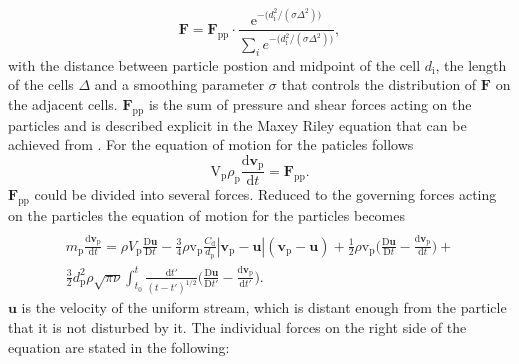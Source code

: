 \documentclass[11pt,a4paper,openany,oneside,parskip=half*]{article}
\renewcommand*\vec[1]{\boldsymbol{#1}}
\begin{document}
\begin{equation}
\vec{F} = \vec{F}_\mathrm{pp} \cdot \frac{\mathrm{e}^{- \big(d_\mathrm{i}^\mathrm{2}/(\sigma \Delta^\mathrm{2})\big)}}{\sum \limits_{i} e^{- \big(d_\mathrm{i}^\mathrm{2}/(\sigma \Delta^\mathrm{2}) \big)}},
\end{equation}
with the distance between particle postion and midpoint of the cell $d_\mathrm{i}$, the length of the cells $\Delta$ and a smoothing parameter $\sigma$ that controls the distribution of $\vec{F}$ on the adjacent cells.
$\vec{F}_\mathrm{pp}$ is the sum of pressure and shear forces acting on the particles and is described explicit in the Maxey Riley equation that can be achieved from \cite{EquationOfMotionForASmallRigidSphereInANonuniformFlow}.
For the equation of motion for the paticles follows
\begin{equation}
\mathrm{V}_\mathrm{p} \rho_\mathrm{p} \frac{\mathrm{d}\vec{v}_\mathrm{p}}{\mathrm{d}t} = \vec{F}_\mathrm{pp}.
\end{equation}
$\vec{F}_\mathrm{pp}$ could be divided into several forces. 
Reduced to the governing forces acting on the particles the equation of motion for the particles becomes
\begin{multline} \label{navier_stokes_particle}
\\ m_\mathrm{p} \frac{\mathrm{d}\vec{v}_\mathrm{p}}{\mathrm{d}t} =\rho V_\mathrm{p}\frac{\mathrm{D}\vec{u}}{\mathrm{D}t} -\frac{3}{4}\rho \mathrm{v}_\mathrm{p} \frac{C_\mathrm{d}}{d_\mathrm{p}}|\vec{v}_\mathrm{p}-\vec{u}|(\vec{v}_\mathrm{p}-\vec{u})+ \frac{1}{2}\rho \mathrm{v}_\mathrm{p} \biggl(\frac{\mathrm{D}\vec{u}}{\mathrm{D}t}-\frac{\mathrm{d}\vec{v}_\mathrm{p}}{\mathrm{d}t}\biggl) + 
\\ \frac{3}{2}d_\mathrm{p}^\mathrm{2}\rho\sqrt{\pi\nu}\int_{t_\mathrm{0}}^{t} \frac{\mathrm{d}t'}{(t-t')^\mathrm{1/2}} \biggl(\frac{\mathrm{D}\vec{u}}{\mathrm{D}t'}- \frac{\mathrm{d}\vec{v}_\mathrm{p}}{\mathrm{d}t'}\biggl).
\end{multline}
$\vec{u}$ is the velocity of the uniform stream, which is distant enough from the particle that it is not disturbed by it.
The individual forces on the right side of the equation are stated in the following:
\newline
\end{document}
